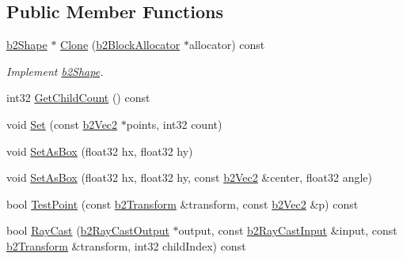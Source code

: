 \subsection*{Public Member Functions}
\begin{DoxyCompactItemize}
\item 
\hyperlink{classb2_shape}{b2\+Shape} $\ast$ \hyperlink{classb2_polygon_shape_ae9ae1676632d6b20f787e1207ed2797f}{Clone} (\hyperlink{classb2_block_allocator}{b2\+Block\+Allocator} $\ast$allocator) const \hypertarget{classb2_polygon_shape_ae9ae1676632d6b20f787e1207ed2797f}{}\label{classb2_polygon_shape_ae9ae1676632d6b20f787e1207ed2797f}

\begin{DoxyCompactList}\small\item\em Implement \hyperlink{classb2_shape}{b2\+Shape}. \end{DoxyCompactList}\item 
int32 \hyperlink{classb2_polygon_shape_ae844375297d19744e01a37b397a5baba}{Get\+Child\+Count} () const 
\item 
void \hyperlink{classb2_polygon_shape_a4d7b35550509f570814b97325a68966b}{Set} (const \hyperlink{structb2_vec2}{b2\+Vec2} $\ast$points, int32 count)
\item 
void \hyperlink{classb2_polygon_shape_a6bb90df8b4a40d1c53b64cc352a855dd}{Set\+As\+Box} (float32 hx, float32 hy)
\item 
void \hyperlink{classb2_polygon_shape_a890690250115483da6c7d69829be087e}{Set\+As\+Box} (float32 hx, float32 hy, const \hyperlink{structb2_vec2}{b2\+Vec2} \&center, float32 angle)
\item 
bool \hyperlink{classb2_polygon_shape_a69ccc2f671394b3cc1a00a16ef36b12b}{Test\+Point} (const \hyperlink{structb2_transform}{b2\+Transform} \&transform, const \hyperlink{structb2_vec2}{b2\+Vec2} \&p) const 
\item 
bool \hyperlink{classb2_polygon_shape_ac13bded10d09c341f64aaa2750dda6b5}{Ray\+Cast} (\hyperlink{structb2_ray_cast_output}{b2\+Ray\+Cast\+Output} $\ast$output, const \hyperlink{structb2_ray_cast_input}{b2\+Ray\+Cast\+Input} \&input, const \hyperlink{structb2_transform}{b2\+Transform} \&transform, int32 child\+Index) const \hypertarget{classb2_polygon_shape_ac13bded10d09c341f64aaa2750dda6b5}{}\label{classb2_polygon_shape_ac13bded10d09c341f64aaa2750dda6b5}


\end{DoxyCompactItemize}
